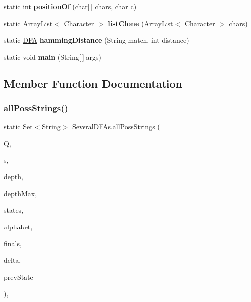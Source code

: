 \begin{DoxyCompactItemize}
static int {\bfseries position\+Of} (char\mbox{[}$\,$\mbox{]} chars, char c)
\item 
\mbox{\label{class_several_d_f_as_a22202d89b114e7731c17f510abc18cc6}} 
static Array\+List$<$ Character $>$ {\bfseries list\+Clone} (Array\+List$<$ Character $>$ chars)
\item 
\mbox{\label{class_several_d_f_as_a85acb079d15300d1a001ed48ca8d666a}} 
static \mbox{\hyperlink{class_d_f_a}{D\+FA}} {\bfseries hamming\+Distance} (String match, int distance)
\item 
\mbox{\label{class_several_d_f_as_a2a1e5f53d65b24817e1865c2961c75ad}} 
static void {\bfseries main} (String\mbox{[}$\,$\mbox{]} args)
\end{DoxyCompactItemize}


\subsection{Member Function Documentation}
\mbox{\label{class_several_d_f_as_a43b88bc47b42d281c9169bf7b1377f6a}} 
\subsubsection{\texorpdfstring{allPossStrings()}{allPossStrings()}}
{\footnotesize\ttfamily static Set$<$String$>$ Several\+D\+F\+As.\+all\+Poss\+Strings (\begin{DoxyParamCaption}\item[{Set$<$ \mbox{\hyperlink{class_d_f_a}{D\+FA}} $>$}]{Q,  }\item[{String}]{s,  }\item[{int}]{depth,  }\item[{int}]{depth\+Max,  }\item[{Set$<$ String $>$}]{states,  }\item[{Set$<$ Character $>$}]{alphabet,  }\item[{Set$<$ String $>$}]{finals,  }\item[{Hash\+Map$<$ \mbox{\hyperlink{class_tuple}{Tuple}}, String $>$}]{delta,  }\item[{String}]{prev\+State }\end{DoxyParamCaption})\hspace{0.3cm}{\ttfamily [inline]}, {\ttfamily [static]}}

